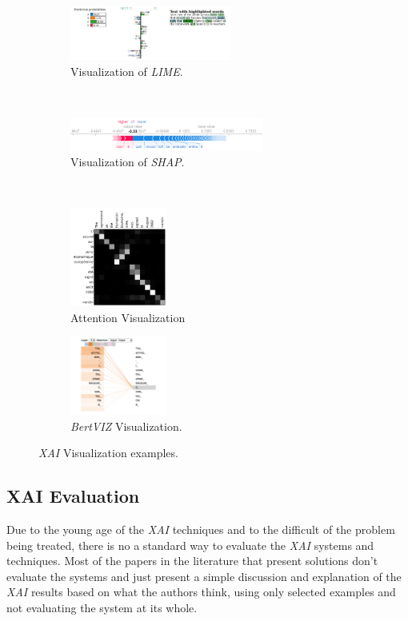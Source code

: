 \paragraph{}
\begin{figure}[h]
\centering
\begin{subfigure}{0.3\textwidth}
  \centering
	\includegraphics[width=200px]{images/lime-result-2a}
	\caption{Visualization of \emph{LIME}.}
	\label{fig:vis-lime}
\end{subfigure}
\medskip\\
\begin{subfigure}{0.3\textwidth}
  \centering
	\includegraphics[width=240px]{images/shap}
	\caption{Visualization of \emph{SHAP}.}
	\label{fig:vis-shap}
\end{subfigure}
\medskip\\
\begin{subfigure}{0.45\textwidth}
  \centering
	\includegraphics[width=120px]{images/attention}
	\caption{Attention Visualization}
	\label{fig:vis-att}
\end{subfigure}
\begin{subfigure}{0.45\textwidth}
  \centering
	\includegraphics[width=120px]{images/selfattention}
	\caption{\emph{BertVIZ} Visualization.}
	\label{fig:vis-bertviz}
\end{subfigure}
\caption{\emph{XAI} Visualization examples.}
\label{fig:vis-examples}
\end{figure}

\subsection{XAI Evaluation}
\label{xai-evaluation}
\noindent Due to the young age of the \emph{XAI} techniques and to the difficult of the problem being treated, there is no a standard way to evaluate the \emph{XAI} systems and techniques. Most of the papers in the literature that present solutions \cite{Xie2017} don't evaluate the systems and just present a simple discussion and explanation of the \emph{XAI} results based on what the authors think, using only selected examples and not evaluating the system at its whole.
